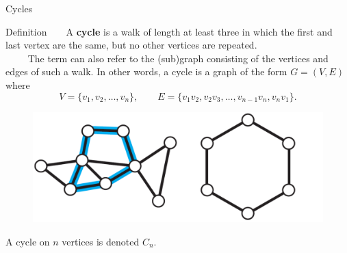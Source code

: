 \documentclass{beamer}
\def\bl[#1]#2{\begin{block}{#1}#2\end{block}}
\begin{document}
\begin{frame}{Cycles}
\bl[Definition]{~~~~A \textbf{cycle} is a walk of length at least three in which the first and last vertex are the same, but no other vertices are repeated. \\
~~~~ The term can also refer to the (sub)graph consisting of the vertices and edges of such a walk. In other words, a cycle is a graph of the form $G=(V,E)$ where 
\[
V=\{v_1,v_2,\dots,v_n\},\qquad E=\{v_1v_2,v_2v_3,\dots,v_{n-1}v_n,v_nv_1\}.
\]}
\begin{figure}
\centering
\includegraphics[scale=0.25]{Cycle.pdf}
\end{figure}\vspace{-0.5cm}
A cycle on $n$ vertices is denoted $C_n$.
\end{frame}
\end{document}

